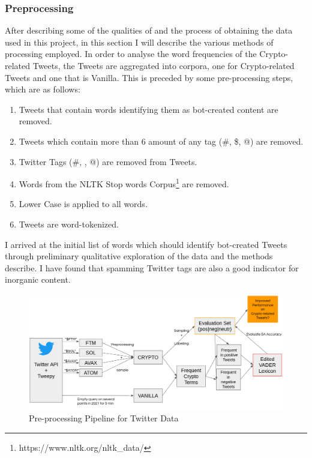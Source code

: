 \documentclass[11pt]{article}
\begin{document}
\subsubsection{Preprocessing}
After describing some of the qualities of and the process of obtaining the data used in this project, in this section I will describe the various methods of processing employed. In order to analyse the word frequencies of the Crypto-related Tweets, the Tweets are aggregated into corpora, one for Crypto-related Tweets and one that is Vanilla. This is preceded by some pre-processing steps, which are as follows:

\begin{enumerate}
  \item Tweets that contain words identifying them as bot-created content are removed.
  \item Tweets which contain more than 6 amount of any tag (\#, \$, @) are removed. 
  \item Twitter Tags (\#, \textdollar, @) are removed from Tweets. 
  \item Words from the NLTK Stop words Corpus\footnote{https://www.nltk.org/nltk\_data/} are removed.
  \item Lower Case is applied to all words.
  \item Tweets are word-tokenized.
\end{enumerate}
I arrived at the initial list of words which should identify bot-created Tweets through preliminary qualitative exploration of the data and the methods \citet{KRAAIJEVELD2020101188} describe. I have found that spamming Twitter tags are also a good indicator for inorganic content.

\begin{figure}
\centering
\includegraphics[scale=0.5]{figures/twitter_pipeline.png}
\caption {Pre-processing Pipeline for Twitter Data}
\label{fig:twitter_pipeline}
\end{figure}
\end{document}
